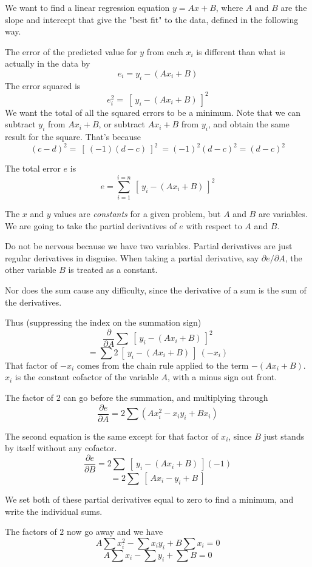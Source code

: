 \documentclass[11pt, oneside]{article}
\begin{document}
We want to find a linear regression equation $y = Ax + B$, where $A$ and $B$ are the slope and intercept that give the "best fit" to the data, defined in the following way.  

The error of the predicted value for $y$ from each $x_i$ is different than what is actually in the data by
\[ e_i = y_i - (Ax_i + B) \]
The error squared is
\[ e_i^2 = \ [ \ y_i - (Ax_i + B) \ ]^2 \]
We want the total of all the squared errors to be a minimum.  Note that we can subtract $y_i$ from $Ax_i + B$, or subtract $Ax_i + B$ from $y_i$, and obtain the same result for the square.  That's because
\[ (c - d)^2 = \ [ \ (-1)(d - c) \ ]^2 \ = (-1)^2 (d-c)^2 = (d - c)^2 \]

The total error $e$ is
\[ e = \sum_{i=1}^{i=n}  \ [ \ y_i - (Ax_i + B) \ ]^2 \]

The $x$ and $y$ values are \emph{constants} for a given problem, but $A$ and $B$ are variables.  We are going to take the partial derivatives of $e$ with respect to $A$ and $B$.  

Do not be nervous because we have two variables.  Partial derivatives are just regular derivatives in disguise.  When taking a partial derivative, say $\partial e/\partial A$, the other variable $B$ is treated as a constant.

Nor does the sum cause any difficulty, since the derivative of a sum is the sum of the derivatives.  

Thus (suppressing the index on the summation sign)
\[ \frac{\partial}{\partial A} \sum  \ [ \ y_i - (Ax_i + B) \ ]^2 \]
\[ = \sum  2 \ [ \ y_i - (Ax_i + B) \ ] \ (-x_i) \]
That factor of $-x_i$ comes from the chain rule applied to the term $-(Ax_i + B)$.  $x_i$ is the constant cofactor of the variable $A$, with a minus sign out front.

The factor of $2$ can go before the summation, and multiplying through
\[ \frac{\partial e}{\partial A} = 2 \sum (Ax_i^2 - x_i y_i + B x_i) \]

The second equation is the same except for that factor of $x_i$, since $B$ just stands by itself without any cofactor.
\[ \frac{\partial e}{\partial B} = 2 \sum  \ [ \ y_i - (Ax_i + B) \ ] (-1) \]
\[ = 2 \sum  \ [ \ Ax_i - y_i + B \ ] \]

We set both of these partial derivatives equal to zero to find a minimum, and write the individual sums.  

The factors of $2$ now go away and we have
\[ A \sum x_i^2 -  \sum x_i y_i + B \sum x_i = 0 \]
\[ A \sum x_i -  \sum y_i + \sum B = 0 \]
\end{document}
